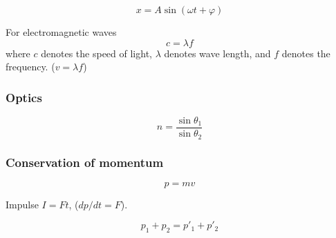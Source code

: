 $$ x = A\sin(\omega t+\varphi) $$

For electromagnetic waves
\[ c = \lambda f \]
where $c$ denotes the speed of light, $\lambda$ denotes wave length, and $f$ denotes the frequency. ($v=\lambda f$)

\subsubsection{Optics}

$$ n = \frac{\sin\theta_1}{\sin\theta_2} $$

\subsubsection{Conservation of momentum}

$$ p = mv $$

Impulse $I=Ft$, ($dp/dt = F$).

$$ p_1 + p_2 = p'_1 + p'_2 $$
